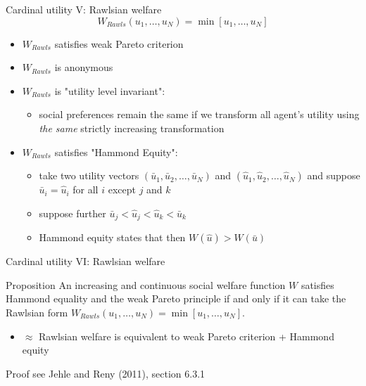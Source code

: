 \documentclass[bigger]{beamer}
\begin{document}
\begin{frame}[label={sec:orgfd8b3a7}]{Cardinal utility V: Rawlsian welfare}
$$W_{Rawls}(u_1,\dots,u_N)=\min[u_1,\dots,u_N]$$

\begin{itemize}
\item \(W_{Rawls}\) satisfies weak Pareto criterion
\item \(W_{Rawls}\) is anonymous
\item \(W_{Rawls}\) is "utility level invariant":
\begin{itemize}
\item social preferences remain the same if we transform all agent's utility using \emph{the same} strictly increasing transformation
\end{itemize}
\item \(W_{Rawls}\) satisfies "Hammond Equity":
\begin{itemize}
\item take two utility vectors \((\bar u_1,\bar u_2,\dots,\bar u_N)\) and \((\hat u_1,\hat u_2,\dots,\hat u_N)\) and suppose \(\bar u_i=\hat u_i\) for all \(i\) except \(j\) and \(k\)
\item suppose further \(\bar u_j<\hat u_j<\hat u_k<\bar u_k\)
\item Hammond equity states that then \(W(\hat u)> W(\bar u)\)
\end{itemize}
\end{itemize}
\end{frame}
\begin{frame}[label={sec:org1191a91}]{Cardinal utility VI: Rawlsian welfare}
\begin{block}{Proposition}
An increasing and continuous social welfare function \(W\) satisfies Hammond equality and the weak Pareto principle if and only if it can take the Rawlsian form \(W_{Rawls}(u_1,\dots,u_N)=\min[u_1,\dots,u_N]\).
\end{block}
\begin{itemize}
\item \(\approx\) Rawlsian welfare is equivalent to weak Pareto criterion  + Hammond equity
\end{itemize}
\begin{block}{Proof}
see Jehle and Reny (2011), section 6.3.1
\end{block}
\end{frame}
\end{document}
